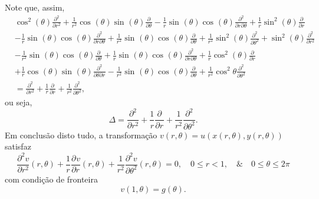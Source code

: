 \documentclass[../pde_notes.tex]{subfiles}
\begin{document}
Note que, assim,
\begin{align*}
	 & \cos^{2}{(\theta )}\frac{\partial^{2}}{\partial r^{2}} + \frac{1}{r^{2}}\cos^{}{(\theta )}\sin^{}{(\theta )}\frac{\partial^{}}{\partial \theta ^{}} - \frac{1}{r}\sin^{}{(\theta )}\cos^{}{(\theta )}\frac{\partial^{2}}{\partial r \partial \theta ^{}} + \frac{1}{r}\sin^{2}{(\theta )}\frac{\partial^{}}{\partial r^{}}                 \\
	 & - \frac{1}{r}\sin^{}{(\theta )}\cos^{}{(\theta )}\frac{\partial^{2}}{\partial r \partial \theta ^{}} + \frac{1}{r^{2}}\sin^{}{(\theta) }\cos^{}{(\theta )}\frac{\partial^{}}{\partial \theta ^{}} + \frac{1}{r^{2}}\sin^{2}{(\theta )}\frac{\partial^{2}}{\partial \theta ^{2}} + \sin^{2}{(\theta )}\frac{\partial^{2}}{\partial r^{2}}   \\
	 & - \frac{1}{r^{2}}\sin^{}{(\theta )}\cos^{}{(\theta )}\frac{\partial^{}}{\partial \theta ^{}} + \frac{1}{r}\sin^{}{(\theta )}\cos^{}{(\theta )}\frac{\partial^{2}}{\partial r \partial \theta ^{}} + \frac{1}{r}\cos^{2}{(\theta )}\frac{\partial^{}}{\partial r^{}}                                                                        \\
	 & + \frac{1}{r}\cos^{}{(\theta )}\sin^{}{(\theta )}\frac{\partial^{2}}{\partial \theta \partial r^{}} - \frac{1}{r^{2}}\sin^{}{(\theta )}\cos^{}{(\theta )}\frac{\partial^{}}{\partial \theta ^{}} + \frac{1}{r^{2}}\cos^{2}{\theta }\frac{\partial^{2}}{\partial \theta ^{2}}                                                               \\
	 & = \frac{\partial^{2}}{\partial r^{2}} + \frac{1}{r}\frac{\partial^{}}{\partial r^{}} + \frac{1}{r^{2}}\frac{\partial^{2}}{\partial \theta ^{2}}                                                                                                                                                                                          ,
\end{align*}
ou seja,
\[
	\Delta = \frac{\partial^{2}}{\partial r^{2}} + \frac{1}{r}\frac{\partial^{}}{\partial r^{}} + \frac{1}{r^{2}}\frac{\partial^{2}}{\partial \theta ^{2}}.
\]
Em conclusão disto tudo, a transformação \(v(r, \theta ) = u(x(r, \theta ), y(r, \theta ))\) satisfaz
\[
	\frac{\partial^{2}v}{\partial r^{2}}(r, \theta ) + \frac{1}{r}\frac{\partial^{}v}{\partial r^{}}(r, \theta ) + \frac{1}{r^{2}}\frac{\partial^{2}v}{\partial \theta ^{2}}(r, \theta ) = 0, \quad 0\leq r<1,\quad\&\quad 0\leq \theta \leq 2\pi
\]
com condição de fronteira
\[
	v(1,\theta ) = g(\theta ).
\]
\end{document}
